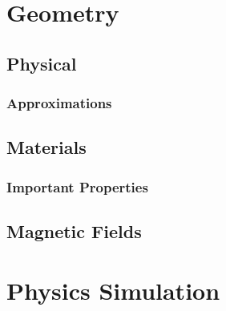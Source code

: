 \chapter{Geometry} %
\label{cha:geometry}

\section{Physical} %
\label{sec:physical}
\subsection{Approximations} %
\label{sub:approximations}

\section{Materials} %
\label{sec:materials}
\subsection{Important Properties} %
\label{sub:important_properties}


\section{Magnetic Fields} %
\label{sec:magnetic_fields}

\chapter{Physics Simulation} %
\label{cha:physics_simulation}
